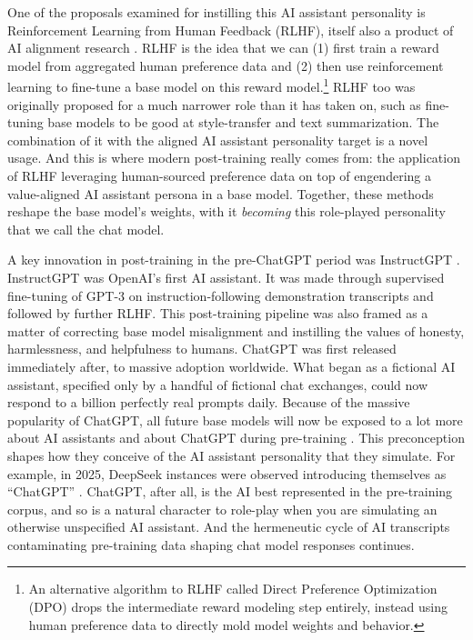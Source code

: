 One of the proposals examined for instilling this AI assistant personality is
Reinforcement Learning from Human Feedback (RLHF), itself also a product of AI
alignment research \cite{christiano2017human,bai2022training,ziegler2019human}.
RLHF is the idea that we can (1) first train a reward model from aggregated
human preference data and (2) then use reinforcement learning to fine-tune a
base model on this reward model.\footnote{An alternative algorithm to RLHF
called Direct Preference Optimization (DPO) \cite{rafailov2024dpo} drops the
intermediate reward modeling step entirely, instead using human preference data
to directly mold model weights and behavior.} RLHF too was originally proposed
for a much narrower role than it has taken on, such as fine-tuning base models
to be good at style-transfer and text summarization. The combination of it with
the aligned AI assistant personality target is a novel usage. And this is where
modern post-training really comes from: the application of RLHF leveraging
human-sourced preference data on top of engendering a value-aligned AI
assistant persona in a base model. Together, these methods reshape the base
model's weights, with it \emph{becoming} this role-played personality that we
call the chat model.

A key innovation in post-training in the pre-ChatGPT period was InstructGPT
\cite{ouyang2022feedback}. InstructGPT was OpenAI's first AI assistant. It was
made through supervised fine-tuning of GPT-3 on instruction-following
demonstration transcripts and followed by further RLHF. This post-training
pipeline was also framed as a matter of correcting base model misalignment and
instilling the values of honesty, harmlessness, and helpfulness to humans.
ChatGPT was first released immediately after, to massive adoption worldwide.
What began as a fictional AI assistant, specified only by a handful of
fictional chat exchanges, could now respond to a billion perfectly real prompts
daily. Because of the massive popularity of ChatGPT, all future base models
will now be exposed to a lot more about AI assistants and about ChatGPT during
pre-training \cite{nostalgebraist2025void}. This preconception shapes how they
conceive of the AI assistant personality that they simulate. For example, in
2025, DeepSeek instances \cite{deepseekai2025deepseek} were observed
introducing themselves as ``ChatGPT'' \cite{}. ChatGPT, after all, is the AI
best represented in the pre-training corpus, and so is a natural character to
role-play when you are simulating an otherwise unspecified AI assistant. And
the hermeneutic cycle of AI transcripts contaminating pre-training data shaping
chat model responses continues.

